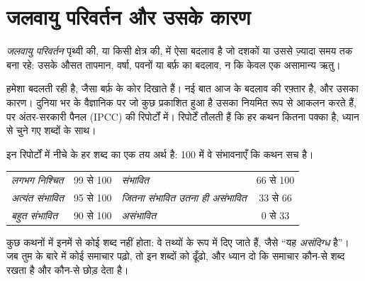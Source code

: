 \section{जलवायु परिवर्तन और उसके कारण}

\begin{definition}[जलवायु परिवर्तन]\label{def:g9:climate-past-and-present:climate-change}
\emph{जलवायु परिवर्तन} पृथ्वी की, या किसी क्षेत्र की,  में
ऐसा बदलाव है जो दशकों या उससे ज़्यादा समय तक बना रहे: उसके औसत तापमान, वर्षा, पवनों या
बर्फ़ का बदलाव, न कि केवल एक असामान्य
ऋतु।
\end{definition}

 हमेशा बदलती रही है, जैसा बर्फ़ के कोर दिखाते हैं। नई बात आज के बदलाव की रफ़्तार
है, और उसका कारण। दुनिया भर के वैज्ञानिक  पर जो कुछ प्रकाशित हुआ है उसका नियमित
रूप से आकलन करते हैं,  पर अंतर-सरकारी पैनल (IPCC) की रिपोर्टों में।
रिपोर्टें तौलती हैं कि हर कथन कितना पक्का है, ध्यान से चुने गए शब्दों के
साथ।

इन रिपोर्टों में नीचे के हर शब्द का एक तय अर्थ है: 100 में वे संभावनाएँ कि कथन सच
है।

\begin{center}
{\small
\begin{tabular}{|l|c||l|c|}
\hline
\emph{लगभग निश्चित} & 99 से 100 & \emph{संभावित} & 66 से 100 \\
\emph{अत्यंत संभावित} & 95 से 100 & \emph{जितना संभावित उतना ही असंभावित} & 33 से 66 \\
\emph{बहुत संभावित} & 90 से 100 & \emph{असंभावित} & 0 से 33 \\
\hline
\end{tabular}}
\end{center}

\noindent कुछ कथनों में इनमें से कोई शब्द नहीं होता: वे तथ्यों के रूप में दिए जाते हैं,
जैसे ``यह \emph{असंदिग्ध} है''। जब तुम  के बारे में कोई समाचार पढ़ो, तो इन शब्दों
को ढूँढो, और ध्यान दो कि समाचार कौन-से शब्द रखता है और कौन-से
छोड़ देता है।

